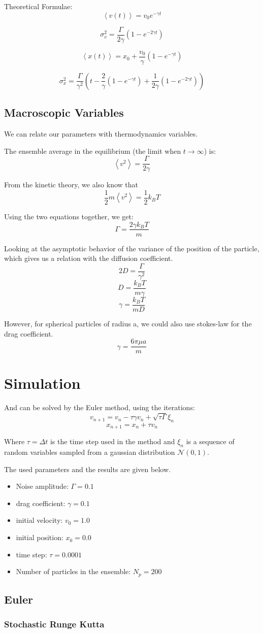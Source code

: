 Theoretical Formulae:
$$ \boxed{\left<v(t)\right> = v_{0} e^{-\gamma t}} $$

$$ \boxed{\sigma_{v}^{2} = \frac{\Gamma}{2\gamma}
	\left(1 - e^{-2\gamma t}\right)}$$

$$ \boxed{\left<x(t)\right> = x_{0} + \frac{v_{0}}{\gamma}\left(1 - e^{-\gamma t}\right)}$$

$$ \boxed{\sigma_{x}^{2} = \frac{\Gamma}{\gamma^{2}} \left(t - \frac{2}{\gamma}(1-e^{-\gamma t}) + \frac{1}{2\gamma}\left(1-e^{-2\gamma t}\right) \right)}$$

\subsection{Macroscopic Variables}

We can relate our parameters with thermodynamics variables.

The ensemble average in the equilibrium (the limit when $t \rightarrow \infty$) is:
$$ \left< v^{2} \right> = \frac{\Gamma}{2\gamma} $$

From the kinetic theory, we also know that
$$ \frac{1}{2} m \left< v^{2} \right> = \frac{1}{2}k_{B}T $$

Using the two equations together, we get:
$$ \boxed{\Gamma = \frac{2\gamma k_{B}T}{m}}$$

Looking at the asymptotic behavior of the variance of the position of the particle, which gives us a relation with the diffusion coefficient.
$$ 2D = \frac{\Gamma}{\gamma^2} $$
$$ D = \frac{k_{B}T}{m\gamma} $$
$$ \boxed{\gamma = \frac{k_{B}T}{mD}} $$

However, for spherical particles of radius a, we could also use stokes-law for the drag coefficient.
$$ \boxed{\gamma = \frac{6\pi \mu a}{m}} $$

\section{Simulation}
And can be solved by the Euler method, using the iterations:
$$ \boxed{v_{n+1} = v_{n} - \tau \gamma v_{n} + \sqrt{\tau\Gamma}\xi_{n}} $$
$$\boxed{ x_{n+1} = x_{n} + \tau v_{n} }$$

Where $\tau = \Delta t$ is the time step used in the method and $\xi_{n}$ is a sequence of random variables sampled from a gaussian distribution $\mathcal{N}(0,1)$. \par 
The used parameters and the results are given below.
\begin{itemize}
	\item Noise amplitude: $ \Gamma = 0.1 $
	\item drag coefficient: $ \gamma = 0.1 $
	\item initial velocity: $ v_{0} = 1.0 $
	\item initial position: $ x_{0} = 0.0 $
	\item time step: $ \tau = 0.0001 $
	\item Number of particles in the ensemble: $ N_{p} = 200 $
\end{itemize}

\subsection{Euler}

\subsubsection{Stochastic Runge Kutta}
